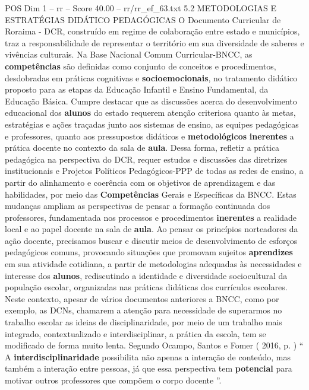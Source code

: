 \begin{textsample}{POS Dim 1 – rr – Score 40.00 – rr/rr\_ef\_63.txt}  \label{ex:f1_pos_218}
5.2 METODOLOGIAS E ESTRATÉGIAS DIDÁTICO PEDAGÓGICAS O Documento Curricular de Roraima - DCR, construído em regime de colaboração entre estado e municípios, traz a responsabilidade de representar o território em sua diversidade de saberes e vivências culturais.
Na Base Nacional Comum Curricular-BNCC, as \textbf{competências} são definidas como conjunto de conceitos e procedimentos, desdobradas em práticas cognitivas e \textbf{socioemocionais}, no tratamento didático proposto para as etapas da Educação Infantil e Ensino Fundamental, da Educação Básica.
Cumpre destacar que as discussões acerca do desenvolvimento educacional dos \textbf{alunos} do estado requerem atenção criteriosa quanto às metas, estratégias e ações traçadas junto aos sistemas de ensino, as equipes pedagógicas e professores, quanto aos pressupostos didáticos e \textbf{metodológicos} \textbf{inerentes} a prática docente no contexto da sala de \textbf{aula}.
Dessa forma, refletir a prática pedagógica na perspectiva do DCR, requer estudos e discussões das diretrizes institucionais e Projetos Políticos Pedagógicos-PPP de todas as redes de ensino, a partir do alinhamento e coerência com os objetivos de aprendizagem e das habilidades, por meio das \textbf{Competências} Gerais e Específicas da BNCC.
Estas mudanças ampliam as perspectivas de pensar a formação continuada dos professores, fundamentada nos processos e procedimentos \textbf{inerentes} a realidade local e ao papel docente na sala de \textbf{aula}.
Ao pensar os princípios norteadores da ação docente, precisamos buscar e discutir meios de desenvolvimento de esforços pedagógicos comuns, provocando situações que promovam sujeitos \textbf{aprendizes} em sua atividade cotidiana, a partir de metodologias adequadas às necessidades e interesse dos \textbf{alunos}, rediscutindo a identidade e diversidade sociocultural da população escolar, organizadas nas práticas didáticas dos currículos escolares.
Neste contexto, apesar de vários documentos anteriores a BNCC, como por exemplo, as DCNs, chamarem a atenção para necessidade de superarmos no trabalho escolar as ideias de disciplinaridade, por meio de um trabalho mais integrado, contextualizado e interdisciplinar, a prática da escola, tem se modificado de forma muito lenta.
Segundo Ocampo, Santos e Fomer ( 2016, p. ) “ A \textbf{interdisciplinaridade} possibilita não apenas a interação de conteúdo, mas também a interação entre pessoas, já que essa perspectiva tem \textbf{potencial} para motivar outros professores que compõem o corpo docente ”.

\end{textsample}
